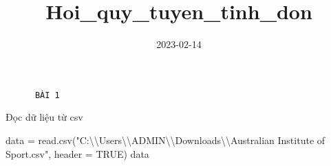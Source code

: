 \documentclass[
]{article}
\title{Hoi\_quy\_tuyen\_tinh\_don}
\author{}
\date{\vspace{-2.5em}2023-02-14}
\newenvironment{Shaded}{\begin{snugshade}}{\end{snugshade}}
\newcommand{\AttributeTok}[1]{\textcolor[rgb]{0.77,0.63,0.00}{#1}}
\newcommand{\ConstantTok}[1]{\textcolor[rgb]{0.00,0.00,0.00}{#1}}
\newcommand{\FunctionTok}[1]{\textcolor[rgb]{0.00,0.00,0.00}{#1}}
\newcommand{\NormalTok}[1]{#1}
\newcommand{\OtherTok}[1]{\textcolor[rgb]{0.56,0.35,0.01}{#1}}
\newcommand{\SpecialCharTok}[1]{\textcolor[rgb]{0.00,0.00,0.00}{#1}}
\newcommand{\StringTok}[1]{\textcolor[rgb]{0.31,0.60,0.02}{#1}}
\begin{document}
\maketitle

\begin{verbatim}
      BÀI 1
\end{verbatim}

Đọc dữ liệu từ csv

\begin{Shaded}
\begin{Highlighting}[]
\NormalTok{data }\OtherTok{=} \FunctionTok{read.csv}\NormalTok{(}\StringTok{"C:}\SpecialCharTok{\textbackslash{}\textbackslash{}}\StringTok{Users}\SpecialCharTok{\textbackslash{}\textbackslash{}}\StringTok{ADMIN}\SpecialCharTok{\textbackslash{}\textbackslash{}}\StringTok{Downloads}\SpecialCharTok{\textbackslash{}\textbackslash{}}\StringTok{Australian Institute of Sport.csv"}\NormalTok{, }\AttributeTok{header =} \ConstantTok{TRUE}\NormalTok{)}
\NormalTok{data}
\end{Highlighting}
\end{Shaded}
\end{document}
